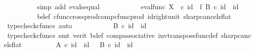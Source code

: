 \begin{isabellebody}
\ \ \ \ \ \ \ \ \isamarkupfalse%
\ {\isacharparenleft}{\kern0pt}simp\ add{\isacharcolon}{\kern0pt}\ evals{\isacharunderscore}{\kern0pt}equal{\isacharparenright}{\kern0pt}\isanewline
\ \ \ \ \ \ \isamarkupfalse%
\ \isamarkupfalse%
\ {\isachardoublequoteopen}{\isachardot}{\kern0pt}{\isachardot}{\kern0pt}{\isachardot}{\kern0pt}\ {\isacharequal}{\kern0pt}\ {\isacharparenleft}{\kern0pt}eval{\isacharunderscore}{\kern0pt}func\ X\ {\isasymone}{\isacharparenright}{\kern0pt}\ {\isasymcirc}\isactrlsub c\ {\isacharparenleft}{\kern0pt}id\ {\isasymone}\ {\isasymtimes}\isactrlsub f\ {\isacharparenleft}{\kern0pt}B\isactrlsup {\isasymflat}{\isacharparenright}{\kern0pt}\isactrlsup {\isasymsharp}{\isacharparenright}{\kern0pt}\ {\isasymcirc}\isactrlsub c\ {\isasymlangle}id\ {\isasymone}{\isacharcomma}{\kern0pt}\ id\ {\isasymone}{\isasymrangle}{\isachardoublequoteclose}\isanewline
\ \ \ \ \ \ \ \ \isamarkupfalse%
\ b{\isacharunderscore}{\kern0pt}def\ cfunc{\isacharunderscore}{\kern0pt}cross{\isacharunderscore}{\kern0pt}prod{\isacharunderscore}{\kern0pt}comp{\isacharunderscore}{\kern0pt}cfunc{\isacharunderscore}{\kern0pt}prod\ id{\isacharunderscore}{\kern0pt}right{\isacharunderscore}{\kern0pt}unit{}\ sharp{\isacharunderscore}{\kern0pt}cancels{\isacharunderscore}{\kern0pt}flat\ \isamarkupfalse%
\ {\isacharparenleft}{\kern0pt}typecheck{\isacharunderscore}{\kern0pt}cfuncs{\isacharcomma}{\kern0pt}\ auto{\isacharparenright}{\kern0pt}\isanewline
\ \ \ \ \ \ \isamarkupfalse%
\ \isamarkupfalse%
\ {\isachardoublequoteopen}{\isachardot}{\kern0pt}{\isachardot}{\kern0pt}{\isachardot}{\kern0pt}\ {\isacharequal}{\kern0pt}\ B\isactrlsup {\isasymflat}\ {\isasymcirc}\isactrlsub c\ {\isasymlangle}id\ {\isasymone}{\isacharcomma}{\kern0pt}\ id\ {\isasymone}{\isasymrangle}{\isachardoublequoteclose}\isanewline
\ \ \ \ \ \ \ \ \isamarkupfalse%
\ {\isacharparenleft}{\kern0pt}typecheck{\isacharunderscore}{\kern0pt}cfuncs{\isacharcomma}{\kern0pt}\ smt\ {\isacharparenleft}{\kern0pt}verit{\isacharparenright}{\kern0pt}\ b{\isacharunderscore}{\kern0pt}def\ comp{\isacharunderscore}{\kern0pt}associative{}\ inv{\isacharunderscore}{\kern0pt}transpose{\isacharunderscore}{\kern0pt}func{\isacharunderscore}{\kern0pt}def{}\ sharp{\isacharunderscore}{\kern0pt}cancels{\isacharunderscore}{\kern0pt}flat{\isacharparenright}{\kern0pt}\isanewline
\ \ \ \ \ \ \isamarkupfalse%
\ \isamarkupfalse%
\ {\isachardoublequoteopen}A\isactrlsup {\isasymflat}\ {\isasymcirc}\isactrlsub c\ {\isasymlangle}id\ {\isasymone}{\isacharcomma}{\kern0pt}\ id\ {\isasymone}{\isasymrangle}\ {\isacharequal}{\kern0pt}\ B\isactrlsup {\isasymflat}\ {\isasymcirc}\isactrlsub c\ {\isasymlangle}id\ {\isasymone}{\isacharcomma}{\kern0pt}\ id\ {\isasymone}{\isasymrangle}{\isachardoublequoteclose}\isanewline

\end{isabellebody}
